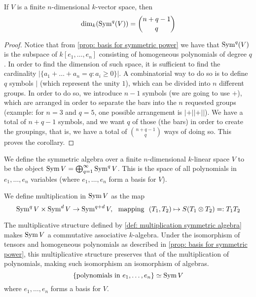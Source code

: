 \begin{corollary}
    If \(V\) is a finite \(n\)-dimensional \(k\)-vector space, then
    \[
        \dim_k(\operatorname{Sym}^q(V)) = \binom{n + q - 1}{q}
    \]
\end{corollary}

\begin{proof}
    Notice that from \cref{prop: basis for symmetric power} we have that
    \(\operatorname{Sym}^q(V)\) is the subspace of \(k[e_1, \dots, e_n]\) consisting of
    homogeneous polynomials of degree \(q\). In order to find the dimension of
    such space, it is sufficient to find the cardinality \(|\{a_1 + \dots + a_n =
    q \colon a_i \geq 0\}|\). A combinatorial way to do so is to define \(q\)
    symbols \(|\) (which represent the unity \(1\)), which can be divided into
    \(n\) different groups. In order to do so, we introduce \(n - 1\) symbols (we
    are going to use \(+\)), which are arranged in order to separate the bars into
    the \(n\) requested groups (example: for \(n = 3\) and \(q = 5\), one possible
    arrangement is \(| + || + ||\)). We have a total of \(n + q - 1\) symbols, and
    we want \(q\) of those (the bars) in order to create the groupings, that
    is, we have a total of \(\binom{n + q - 1}{q}\) ways of doing so. This proves
    the corollary.
\end{proof}

\begin{definition}
    We define the symmetric algebra over a finite \(n\)-dimensional \(k\)-linear
    space \(V\) to be the object \(\operatorname{Sym} V = \bigoplus_{q=1}^\infty \operatorname{Sym}^q V\).
    This is the space of all polynomials in \(e_1, \dots, e_n\) variables (where
    \(e_1, \dots, e_n\) form a basis for \(V\)).

    We define multiplication in \(\operatorname{Sym} V\) as the map
    \begin{equation}\label{def: multiplication symmetric algebra}
        \operatorname{Sym}^q V \times \operatorname{Sym}^d V \to \operatorname{Sym}^{q + d} V,\ \text{ mapping }\
        (T_1, T_2) \mapsto S(T_1 \otimes T_2) =: T_1 T_2
    \end{equation}
\end{definition}

\begin{proposition}
    The multiplicative structure defined by \cref{def: multiplication symmetric
        algebra} makes \(\operatorname{Sym} V\) a commutative associative \(k\)-algebra. Under the
    isomorphism of tensors and homogeneous polynomials as described in
    \cref{prop: basis for symmetric power}, this multiplicative structure
    preserves that of the multiplication of polynomials, making such isomorphism
    an isomorphism of algebras.
    \[
        \{\text{polynomials in } e_1, \dots, e_n\} \simeq \operatorname{Sym} V
    \]
    where \(e_1, \dots, e_n\) forms a basis for \(V\).
\end{proposition}


